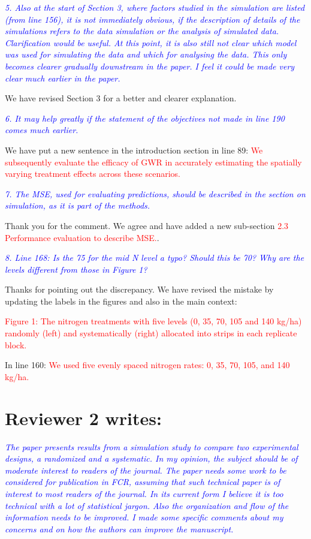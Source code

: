 \documentclass[a4paper]{article}   	%
\newcommand{\revision}[1]{\textcolor{red}{#1}}
\newcommand{\reviewer}[1]{\textcolor{blue}{\textit{#1}}}
\begin{document}
\reviewer{5. Also at the start of Section 3, where factors studied in the simulation are listed (from line 156), it is not immediately obvious, if the description of details of the simulations refers to the data simulation or the analysis of simulated data. Clarification would be useful. At this point, it is also still not clear which model was used for simulating the data and which for analysing the data. This only becomes clearer gradually downstream in the paper. I feel it could be made very clear much earlier in the paper.}

We have revised Section 3 for a better and clearer explanation. 


\reviewer{6. It may help greatly if the statement of the objectives not made in line 190 comes much earlier.}

We have put a new sentence in the introduction section in line 89: \revision{We subsequently evaluate the efficacy of GWR in accurately estimating the spatially varying treatment effects across these scenarios.}


\reviewer{7. The MSE, used for evaluating predictions, should be described in the section on simulation, as it is part of the methods.}

Thank you for the comment. We agree and have added a new sub-section \revision{2.3 Performance evaluation to describe MSE.}.


\reviewer{8. Line 168: Is the 75 for the mid N level a typo? Should this be 70? Why are the levels different from those in Figure 1?}

Thanks for pointing out the discrepancy. We have revised the mistake by updating the labels in the figures and also in the main context: 

\revision{Figure 1: The nitrogen treatments with five levels (0, 35, 70, 105 and 140 kg/ha) randomly (left) and systematically (right) allocated into strips in each replicate block.}

In line 160: \revision{We used five evenly spaced nitrogen rates: 0, 35, 70, 105, and 140 kg/ha.}

\section*{Reviewer 2 writes:}

\reviewer{The paper presents results from a simulation study to compare two experimental designs, a randomized and a systematic. In my opinion, the subject should be of moderate interest to readers of the journal. The paper needs some work to be considered for publication in FCR, assuming that such technical paper is of interest to most readers of the journal. In its current form I believe it is too technical with a lot of statistical jargon. Also the organization and flow of the information needs to be improved. I made some specific comments about my concerns and on how the authors can improve the manuscript.}
\end{document}
